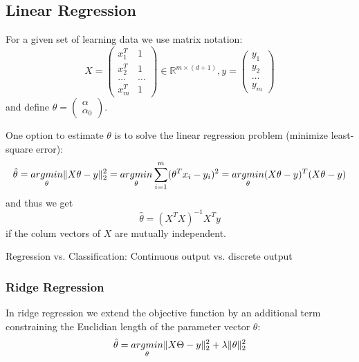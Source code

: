 \subsection*{Linear Regression}
For a given set of learning data we use matrix notation:
$$X =\begin{pmatrix}
    x_1^T & 1\\
    x_2^T & 1\\
    \dots & \dots\\
    x_m^T & 1 
\end{pmatrix} \in \mathbb{R}^{m \times (d+1)}, y = \begin{pmatrix} y_1 \\ y_2\\ \dots \\y_m \end{pmatrix}$$
and define $\theta = \begin{pmatrix} \alpha \\ \alpha_0\end{pmatrix}$.

    One option to estimate $\theta$ is to solve the linear regression problem (minimize least-square error):
$$\hat{\theta} = \underset{\theta}{argmin} \lVert X \theta - y\rVert_2^2 = \underset{\theta}{argmin} \sum_{i=1}^{m} (\theta^T x_i - y_i)^2 = \underset{\theta}{argmin} (X \theta - y)^T (X \theta -y)$$
and thus we get
$$ \hat{\theta} = (X^T X)^{-1} X^T y $$
if the colum vectors of $X$ are mutually independent.

Regression vs. Classification: Continuous output vs. discrete output

\subsubsection*{Ridge Regression}
In ridge regression we extend the objective function by an additional term constraining the Euclidian length of the parameter vector $\theta$:
$$ \hat{\theta} = \underset{\theta}{argmin} \lVert X\Theta - y\rVert_2^2 + \lambda \lVert\theta\rVert_2^2$$


